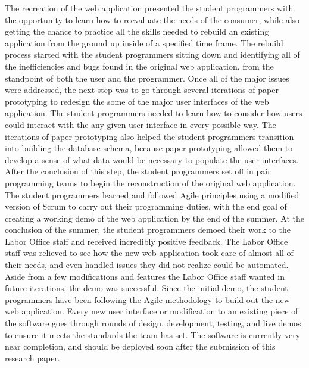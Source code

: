 The recreation of the web application presented the student programmers with the opportunity to learn how to reevaluate the needs of the consumer, while also getting the chance to practice all the skills needed to rebuild an existing application from the ground up inside of a specified time frame. The rebuild process started with the student programmers sitting down and identifying all of the inefficiencies and bugs found in the original web application, from the standpoint of both the user and the programmer. Once all of the major issues were addressed, the next step was to go through several iterations of paper prototyping to redesign the some of the major user interfaces of the web application. The student programmers needed to learn how to consider how users could interact with the any given user interface in every possible way. The iterations of paper prototyping also helped the student programmers transition into building the database schema, because paper prototyping allowed them to develop a sense of what data would be necessary to populate the user interfaces. After the conclusion of this step, the student programmers set off in pair programming teams to begin the reconstruction of the original web application. The student programmers learned and followed Agile principles using a modified version of Scrum to carry out their programming duties, with the end goal of creating a working demo of the web application by the end of the summer. At the conclusion of the summer, the student programmers demoed their work to the Labor Office staff and received incredibly positive feedback. The Labor Office staff was relieved to see how the new web application took care of almost all of their needs, and even handled issues they did not realize could be automated. Aside from a few modifications and features the Labor Office staff wanted in future iterations, the demo was successful. Since the initial demo, the student programmers have been following the Agile methodology to build out the new web application. Every new user interface or modification to an existing piece of the software goes through rounds of design, development, testing, and live demos to ensure it meets the standards the team has set. The software is currently very near completion, and should be deployed soon after the submission of this research paper.


